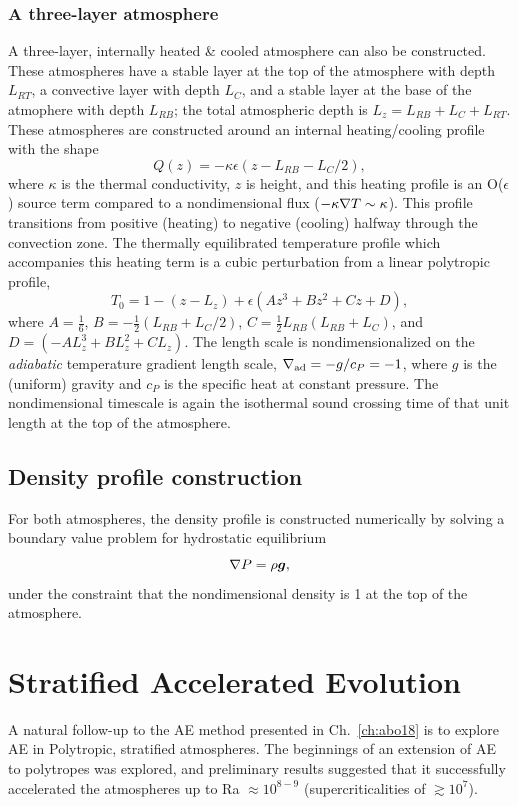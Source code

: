 \subsubsection{A three-layer atmosphere}
A three-layer, internally heated \& cooled atmosphere can also be constructed.
These atmospheres have a stable layer at the top of the atmosphere with depth $L_{RT}$, a convective layer with depth $L_C$, and a stable layer at the base of the atmophere with depth $L_{RB}$; the total atmospheric depth is $L_z = L_{RB} + L_C + L_{RT}$.
These atmospheres are constructed around an internal heating/cooling profile with the shape
\begin{equation}
Q(z) = -\kappa \epsilon(z - L_{RB} - L_C/2),
\end{equation}
where $\kappa$ is the thermal conductivity, $z$ is height, and this heating profile is an O($\epsilon$) source term compared to a nondimensional flux ($-\kappa\nabla T \sim \kappa$).
This profile transitions from positive (heating) to negative (cooling) halfway through the convection zone.
The thermally equilibrated temperature profile which accompanies this heating term is a cubic perturbation from a linear polytropic profile,
\begin{equation}
T_0 = 1 - (z - L_z) + \epsilon(A z^3 + B z^2 + Cz + D),
\end{equation}
where $A = \frac{1}{6}$, $B = -\frac{1}{2}(L_{RB} + L_C/2)$, $C = \frac{1}{2}L_{RB}(L_{RB} + L_C)$, and $D = (-AL_z^3 + BL_z^2 + CL_z)$.
The length scale is nondimensionalized on the \emph{adiabatic} temperature gradient length scale, $\nabla_{\text{ad}} = -g/c_P = -1$, where $g$ is the (uniform) gravity and $c_P$ is the specific heat at constant pressure.
The nondimensional timescale is again the isothermal sound crossing time of that unit length at the top of the atmosphere.

\subsection{Density profile construction}
For both atmospheres, the density profile is constructed numerically by solving a boundary value problem for hydrostatic equilibrium
\begin{equation}
\nabla P = \rho \bm{g},
\end{equation}
under the constraint that the nondimensional density is 1 at the top of the atmosphere.


\section{Stratified Accelerated Evolution}
\label{sec:stratified_ae}
A natural follow-up to the AE method presented in Ch.~\ref{ch:abo18} is to explore AE in Polytropic, stratified atmospheres.
The beginnings of an extension of AE to polytropes was explored, and preliminary results suggested that it successfully accelerated the atmospheres up to Ra $\approx 10^{8-9}$ (supercriticalities of $\gtrsim 10^7$).

